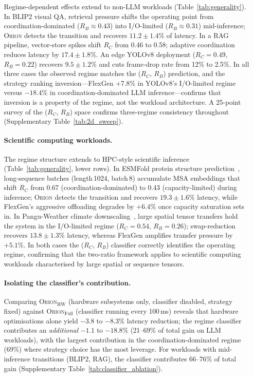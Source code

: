 Regime-dependent effects extend to non-LLM workloads (Table~\ref{tab:generality}).
In BLIP2 visual QA, retrieval pressure shifts the operating point from
coordination-dominated ($R_B \approx 0.43$) into I/O-limited ($R_B \approx 0.31$)
mid-inference; \textsc{Orion} detects the transition and recovers $11.2 \pm 1.4\%$
of latency.
In a RAG pipeline, vector-store spikes shift $R_C$ from 0.46 to 0.58;
adaptive coordination reduces latency by $17.4 \pm 1.8\%$.
An edge YOLOv8 deployment ($R_C\!=\!0.49$, $R_B\!=\!0.22$) recovers $9.5 \pm 1.2\%$
and cuts frame-drop rate from 12\% to 2.5\%.
In all three cases the observed regime matches the ($R_C$, $R_B$) prediction,
and the strategy ranking inversion---FlexGen +7.8\% in YOLOv8's I/O-limited
regime versus $-18.4\%$ in coordination-dominated LLM inference---confirms that
inversion is a property of the regime, not the workload architecture.
A 25-point survey of the ($R_C$, $R_B$) space confirms three-regime consistency
throughout (Supplementary Table~\ref{tab:2d_sweep}).

\paragraph{Scientific computing workloads.}
The regime structure extends to HPC-style scientific inference
(Table~\ref{tab:generality}, lower rows).
In ESMFold protein structure prediction~\cite{lin2023evolutionary}, long-sequence
batches (length\,1024, batch\,8) accumulate MSA embeddings that shift $R_C$ from
0.67 (coordination-dominated) to 0.43 (capacity-limited) during inference;
\textsc{Orion} detects the transition and recovers $19.3 \pm 1.6\%$ latency, while
FlexGen's aggressive offloading degrades by $+6.4\%$ once capacity saturation sets in.
In Pangu-Weather climate downscaling~\cite{bi2023pangu}, large spatial tensor
transfers hold the system in the I/O-limited regime ($R_C\!=\!0.54$,
$R_B\!=\!0.26$); swap-reduction recovers $13.8 \pm 1.3\%$ latency, whereas
FlexGen amplifies transfer pressure by $+5.1\%$.
In both cases the ($R_C$, $R_B$) classifier correctly identifies the operating
regime, confirming that the two-ratio framework applies to scientific computing
workloads characterised by large spatial or sequence tensors.

\paragraph{Isolating the classifier's contribution.}
Comparing \textsc{Orion}$_{\mathrm{HW}}$ (hardware subsystems only, classifier
disabled, strategy fixed) against \textsc{Orion}$_{\mathrm{Full}}$ (classifier
running every 100\,ms) reveals that hardware optimisations alone yield
$-3.8$ to $-8.3\%$ latency reduction; the regime classifier contributes
an \emph{additional} $-1.1$ to $-18.8\%$ (21--69\% of total gain on LLM
workloads), with the largest contribution in the coordination-dominated
regime (69\%) where strategy choice has the most leverage.
For workloads with mid-inference transitions (BLIP2, RAG), the classifier
contributes 66--76\% of total gain
(Supplementary Table~\ref{tab:classifier_ablation}).

